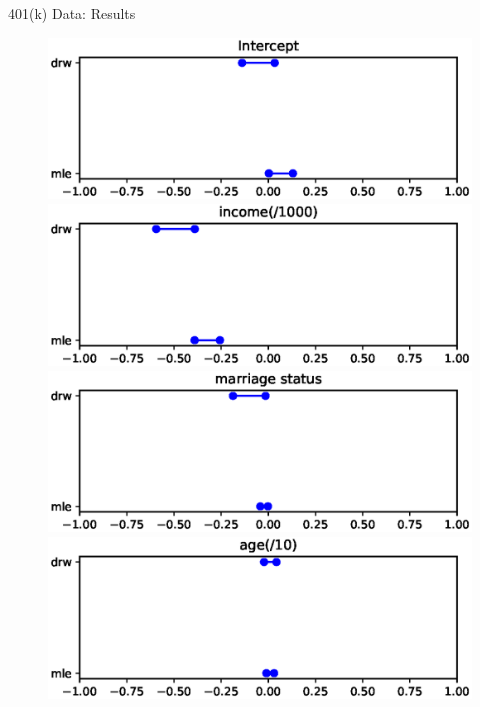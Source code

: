 \documentclass[aspectratio=169,xcolor=dvipsnames]{beamer}
\begin{document}
\begin{frame}{401(k) Data: Results}
\begin{figure}
\begin{minipage}{0.4\textwidth}
\includegraphics[width=\textwidth]{figure/0.eps}
\end{minipage}
\begin{minipage}{0.4\textwidth}
\includegraphics[width=\textwidth]{figure/1.eps}
\end{minipage}

\begin{minipage}{0.4\textwidth}
    \includegraphics[width=\textwidth]{figure/2.eps}
    \end{minipage}
    \begin{minipage}{0.4\textwidth}
    \includegraphics[width=\textwidth]{figure/3.eps}
    \end{minipage}


\end{figure}
\end{frame}
\end{document}
